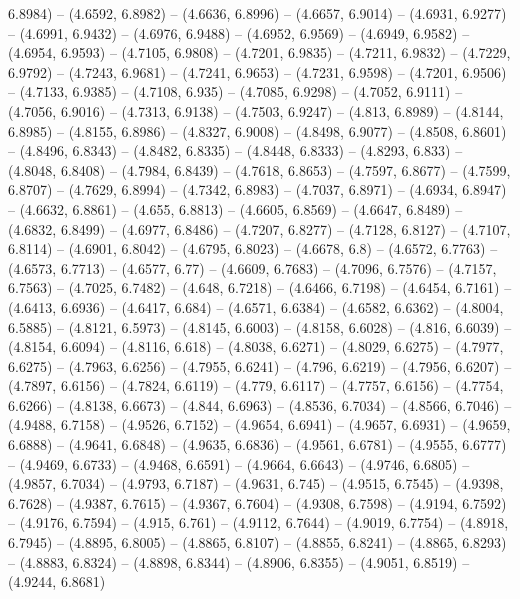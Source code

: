 {   6.8984) -- (4.6592, 6.8982) -- (4.6636, 6.8996) -- (4.6657, 6.9014) -- 
  (4.6931, 6.9277) -- (4.6991, 6.9432) -- (4.6976, 6.9488) -- (4.6952, 6.9569) 
  -- (4.6949, 6.9582) -- (4.6954, 6.9593) -- (4.7105, 6.9808) -- (4.7201, 
  6.9835) -- (4.7211, 6.9832) -- (4.7229, 6.9792) -- (4.7243, 6.9681) -- 
  (4.7241, 6.9653) -- (4.7231, 6.9598) -- (4.7201, 6.9506) -- (4.7133, 6.9385) 
  -- (4.7108, 6.935) -- (4.7085, 6.9298) -- (4.7052, 6.9111) -- (4.7056, 6.9016)
   -- (4.7313, 6.9138) -- (4.7503, 6.9247) -- (4.813, 6.8989) -- (4.8144, 
  6.8985) -- (4.8155, 6.8986) -- (4.8327, 6.9008) -- (4.8498, 6.9077) -- 
  (4.8508, 6.8601) -- (4.8496, 6.8343) -- (4.8482, 6.8335) -- (4.8448, 6.8333) 
  -- (4.8293, 6.833) -- (4.8048, 6.8408) -- (4.7984, 6.8439) -- (4.7618, 6.8653)
   -- (4.7597, 6.8677) -- (4.7599, 6.8707) -- (4.7629, 6.8994) -- (4.7342, 
  6.8983) -- (4.7037, 6.8971) -- (4.6934, 6.8947) -- (4.6632, 6.8861) -- (4.655,
   6.8813) -- (4.6605, 6.8569) -- (4.6647, 6.8489) -- (4.6832, 6.8499) -- 
  (4.6977, 6.8486) -- (4.7207, 6.8277) -- (4.7128, 6.8127) -- (4.7107, 6.8114) 
  -- (4.6901, 6.8042) -- (4.6795, 6.8023) -- (4.6678, 6.8) -- (4.6572, 6.7763) 
  -- (4.6573, 6.7713) -- (4.6577, 6.77) -- (4.6609, 6.7683) -- (4.7096, 6.7576) 
  -- (4.7157, 6.7563) -- (4.7025, 6.7482) -- (4.648, 6.7218) -- (4.6466, 6.7198)
   -- (4.6454, 6.7161) -- (4.6413, 6.6936) -- (4.6417, 6.684) -- (4.6571, 
  6.6384) -- (4.6582, 6.6362) -- (4.8004, 6.5885) -- (4.8121, 6.5973) -- 
  (4.8145, 6.6003) -- (4.8158, 6.6028) -- (4.816, 6.6039) -- (4.8154, 6.6094) --
   (4.8116, 6.618) -- (4.8038, 6.6271) -- (4.8029, 6.6275) -- (4.7977, 6.6275) 
  -- (4.7963, 6.6256) -- (4.7955, 6.6241) -- (4.796, 6.6219) -- (4.7956, 6.6207)
   -- (4.7897, 6.6156) -- (4.7824, 6.6119) -- (4.779, 6.6117) -- (4.7757, 
  6.6156) -- (4.7754, 6.6266) -- (4.8138, 6.6673) -- (4.844, 6.6963) -- (4.8536,
   6.7034) -- (4.8566, 6.7046) -- (4.9488, 6.7158) -- (4.9526, 6.7152) -- 
  (4.9654, 6.6941) -- (4.9657, 6.6931) -- (4.9659, 6.6888) -- (4.9641, 6.6848) 
  -- (4.9635, 6.6836) -- (4.9561, 6.6781) -- (4.9555, 6.6777) -- (4.9469, 
  6.6733) -- (4.9468, 6.6591) -- (4.9664, 6.6643) -- (4.9746, 6.6805) -- 
  (4.9857, 6.7034) -- (4.9793, 6.7187) -- (4.9631, 6.745) -- (4.9515, 6.7545) --
   (4.9398, 6.7628) -- (4.9387, 6.7615) -- (4.9367, 6.7604) -- (4.9308, 6.7598) 
  -- (4.9194, 6.7592) -- (4.9176, 6.7594) -- (4.915, 6.761) -- (4.9112, 6.7644) 
  -- (4.9019, 6.7754) -- (4.8918, 6.7945) -- (4.8895, 6.8005) -- (4.8865, 
  6.8107) -- (4.8855, 6.8241) -- (4.8865, 6.8293) -- (4.8883, 6.8324) -- 
  (4.8898, 6.8344) -- (4.8906, 6.8355) -- (4.9051, 6.8519) -- (4.9244, 6.8681) 
}
